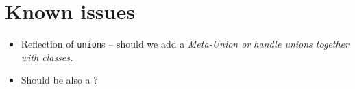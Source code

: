 \section{Known issues}

\begin{itemize}

\item{Reflection of \texttt{union}s -- should we add a \em{Meta-Union} or
handle unions together with classes.}

\item{Should  be also a ?}

\end{itemize}
